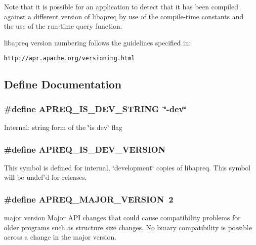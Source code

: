 Note that it is possible for an application to detect that it has been compiled against a different version of libapreq by use of the compile-time constants and the use of the run-time query function.

libapreq version numbering follows the guidelines specified in:

{\tt http://apr.apache.org/versioning.html}



\subsection{Define Documentation}
\subsubsection{\setlength{\rightskip}{0pt plus 5cm}\#define APREQ\_\-IS\_\-DEV\_\-STRING\ \char`\"{}-dev\char`\"{}}\label{apreq__version_8h_a5}


Internal: string form of the \char`\"{}is dev\char`\"{} flag 
\subsubsection{\setlength{\rightskip}{0pt plus 5cm}\#define APREQ\_\-IS\_\-DEV\_\-VERSION}\label{apreq__version_8h_a3}


This symbol is defined for internal, \char`\"{}development\char`\"{} copies of libapreq. This symbol will be undef'd for releases. 
\subsubsection{\setlength{\rightskip}{0pt plus 5cm}\#define APREQ\_\-MAJOR\_\-VERSION\ 2}\label{apreq__version_8h_a0}


major version  Major API changes that could cause compatibility problems for older programs such as structure size changes. No binary compatibility is possible across a change in the major version. 
